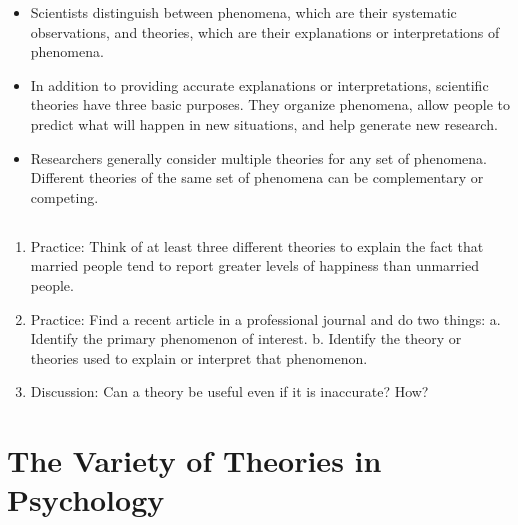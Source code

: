 \begin{itemize}
\item Scientists distinguish between phenomena, which are their systematic observations, and theories, which are their explanations or interpretations of phenomena.
\item In addition to providing accurate explanations or interpretations, scientific theories have three basic purposes. They organize phenomena, allow people to predict what will happen in new situations, and help generate new research.
\item Researchers generally consider multiple theories for any set of phenomena. Different theories of the same set of phenomena can be complementary or competing.
\end{itemize}

\subsection{}

\begin{fullwidth}

\begin{enumerate}

\item Practice: Think of at least three different theories to explain the fact that married people tend to report greater levels of happiness than unmarried people.

\item Practice: Find a recent article in a professional journal and do two things:
a. Identify the primary phenomenon of interest.
b. Identify the theory or theories used to explain or interpret that phenomenon. 
\item Discussion: Can a theory be useful even if it is inaccurate? How?
\end{enumerate}
\end{fullwidth}  

\newpage
\section{The Variety of Theories in Psychology}


